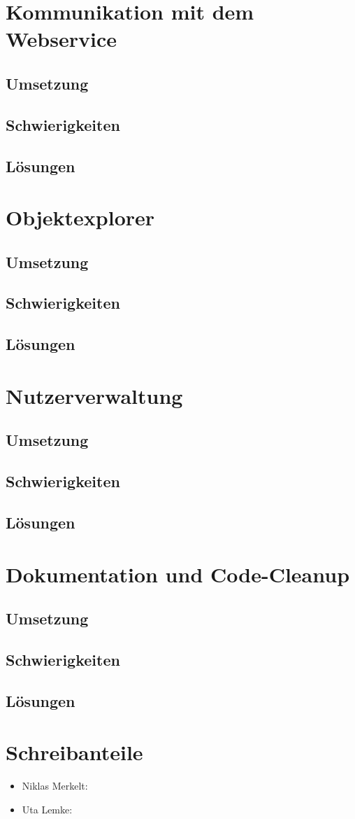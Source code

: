 \documentclass[12pt]{article}
\begin{document}
\section{Kommunikation mit dem Webservice}
\subsection{Umsetzung}
\subsection{Schwierigkeiten}
\subsection{Lösungen}

\section{Objektexplorer}
\subsection{Umsetzung}
\subsection{Schwierigkeiten}
\subsection{Lösungen}

\section{Nutzerverwaltung}
\subsection{Umsetzung}
\subsection{Schwierigkeiten}
\subsection{Lösungen}

\section{Dokumentation und Code-Cleanup}
\subsection{Umsetzung}
\subsection{Schwierigkeiten}
\subsection{Lösungen}

\section{Schreibanteile}
\begin{itemize}
	\item Niklas Merkelt:
	\item Uta Lemke:
\end{itemize}
\end{document}
